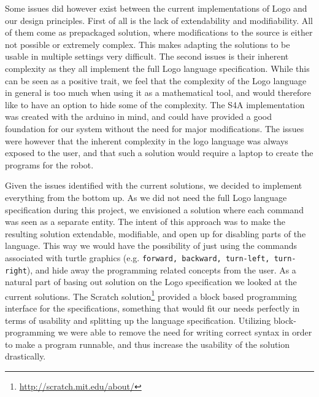 \bigskip\noindent
Some issues did however exist between the current implementations of Logo and our design principles. First of all is the lack of extendability and modifiability. All of them come as prepackaged solution, where modifications to the source is either not possible or extremely complex. This makes adapting the solutions to be usable in multiple settings very difficult. 
The second issues is their inherent complexity as they all implement the full Logo language specification. While this can be seen as a positive trait, we feel that the complexity of the Logo language in general is too much when using it as a mathematical tool, and would therefore like to have an option to hide some of the complexity.
The S4A implementation was created with the arduino in mind, and could have provided a good foundation for our system without the need for major modifications. The issues were however that the inherent complexity in the logo language was always exposed to the user, and that such a solution would require a laptop to create the programs for the robot.

\bigskip\noindent
Given the issues identified with the current solutions, we decided to implement everything from the bottom up. 
As we did not need the full Logo language specification during this project, we envisioned a solution where each command was seen as a separate entity. The intent of this approach was to make the resulting solution extendable, modifiable, and open up for disabling parts of the language. 
This way we would have the possibility of just using the commands associated with turtle graphics (e.g. \texttt{forward, backward, turn-left, turn-right}), and hide away the programming related concepts from the user.
As a natural part of basing out solution on the Logo specification we looked at the current solutions. The Scratch solution\footnote{\url{http://scratch.mit.edu/about/}} provided a block based programming interface for the specifications, something that would fit our needs perfectly in terms of usability and splitting up the language specification. 
Utilizing block-programming we were able to remove the need for writing correct syntax in order to make a program runnable, and thus increase the usability of the solution drastically. 

